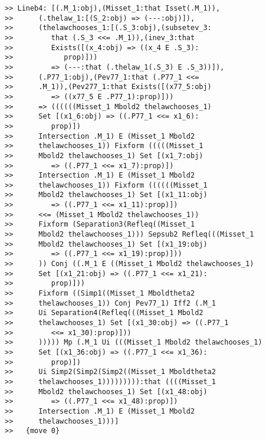 \documentclass[12pt]{article}
\begin{document}
\begin{verbatim}
>> Lineb4: [(.M_1:obj),(Misset_1:that Isset(.M_1)),
>>      (.thelaw_1:[(S_2:obj) => (---:obj)]),
>>      (thelawchooses_1:[(.S_3:obj),(subsetev_3:
>>         that (.S_3 <<= .M_1)),(inev_3:that
>>         Exists([(x_4:obj) => ((x_4 E .S_3):
>>            prop)]))
>>         => (---:that (.thelaw_1(.S_3) E .S_3))]),
>>      (.P77_1:obj),(Pev77_1:that (.P77_1 <<=
>>      .M_1)),(Pev277_1:that Exists([(x77_5:obj)
>>         => ((x77_5 E .P77_1):prop)]))
>>      => ((((((Misset_1 Mbold2 thelawchooses_1)
>>      Set [(x1_6:obj) => ((.P77_1 <<= x1_6):
>>         prop)])
>>      Intersection .M_1) E (Misset_1 Mbold2
>>      thelawchooses_1)) Fixform (((((Misset_1
>>      Mbold2 thelawchooses_1) Set [(x1_7:obj)
>>         => ((.P77_1 <<= x1_7):prop)])
>>      Intersection .M_1) E (Misset_1 Mbold2
>>      thelawchooses_1)) Fixform ((((((Misset_1
>>      Mbold2 thelawchooses_1) Set [(x1_11:obj)
>>         => ((.P77_1 <<= x1_11):prop)])
>>      <<= (Misset_1 Mbold2 thelawchooses_1))
>>      Fixform (Separation3(Refleq((Misset_1
>>      Mbold2 thelawchooses_1))) Sepsub2 Refleq(((Misset_1
>>      Mbold2 thelawchooses_1) Set [(x1_19:obj)
>>         => ((.P77_1 <<= x1_19):prop)]))
>>      )) Conj ((.M_1 E ((Misset_1 Mbold2 thelawchooses_1)
>>      Set [(x1_21:obj) => ((.P77_1 <<= x1_21):
>>         prop)]))
>>      Fixform ((Simp1((Misset_1 Mboldtheta2
>>      thelawchooses_1)) Conj Pev77_1) Iff2 (.M_1
>>      Ui Separation4(Refleq(((Misset_1 Mbold2
>>      thelawchooses_1) Set [(x1_30:obj) => ((.P77_1
>>         <<= x1_30):prop)]))
>>      ))))) Mp (.M_1 Ui (((Misset_1 Mbold2 thelawchooses_1)
>>      Set [(x1_36:obj) => ((.P77_1 <<= x1_36):
>>         prop)])
>>      Ui Simp2(Simp2(Simp2((Misset_1 Mboldtheta2
>>      thelawchooses_1))))))))):that ((((Misset_1
>>      Mbold2 thelawchooses_1) Set [(x1_48:obj)
>>         => ((.P77_1 <<= x1_48):prop)])
>>      Intersection .M_1) E (Misset_1 Mbold2
>>      thelawchooses_1)))]
>>   {move 0}



\end{verbatim}
\end{document}
